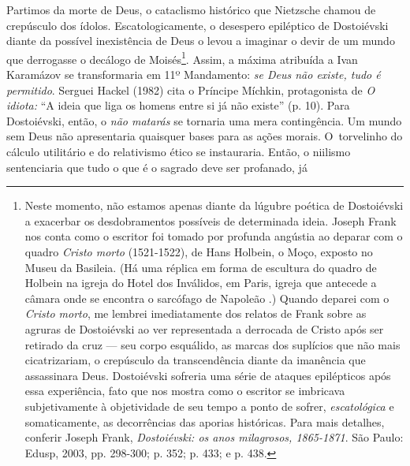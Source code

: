 Partimos da morte de Deus, o cataclismo histórico que Nietzsche chamou
de crepúsculo dos ídolos. Escatologicamente, o desespero epiléptico de
Dostoiévski diante da possível inexistência de Deus o levou a imaginar o
devir de um mundo que derrogasse o decálogo de Moisés\footnote{Neste
  momento, não estamos apenas diante da lúgubre poética de Dostoiévski a
  exacerbar os desdobramentos possíveis de determinada ideia. Joseph
  Frank nos conta como o escritor foi tomado por profunda angústia ao
  deparar com o quadro \emph{Cristo morto} (1521-1522), de Hans Holbein,
  o Moço, exposto no Museu da Basileia. (Há uma réplica em forma de
  escultura do quadro de Holbein na igreja do Hotel dos Inválidos, em
  Paris, igreja que antecede a câmara onde se encontra o sarcófago de
  Napoleão .) Quando deparei com o \emph{Cristo morto}, me lembrei
  imediatamente dos relatos de Frank sobre as agruras de Dostoiévski ao
  ver representada a derrocada de Cristo após ser retirado da cruz ---
  seu corpo esquálido, as marcas dos suplícios que não mais
  cicatrizariam, o crepúsculo da transcendência diante da imanência que
  assassinara Deus. Dostoiévski sofreria uma série de ataques
  epilépticos após essa experiência, fato que nos mostra como o escritor
  se imbricava subjetivamente à objetividade de seu tempo a ponto de
  sofrer, \emph{escatológica} e somaticamente, as decorrências das
  aporias históricas. Para mais detalhes, conferir Joseph Frank,
  \emph{Dostoiévski: os anos milagrosos, 1865-1871}. São Paulo: Edusp,
  2003, pp. 298-300; p. 352; p. 433; e p. 438.}. Assim, a máxima
atribuída a Ivan Karamázov se transformaria em 11º Mandamento: \emph{se
Deus não existe, tudo é permitido}. Serguei Hackel (1982) cita o
Príncipe Míchkin, protagonista de \emph{O idiota:} ``A ideia que liga os
homens entre si já não existe'' (p. 10). Para Dostoiévski, então, o
\emph{não matarás} se tornaria uma mera contingência. Um mundo sem Deus
não apresentaria quaisquer bases para as ações morais. O~torvelinho do
cálculo utilitário e do relativismo ético se instauraria. Então, o
niilismo sentenciaria que tudo o que é o sagrado deve ser profanado, já
